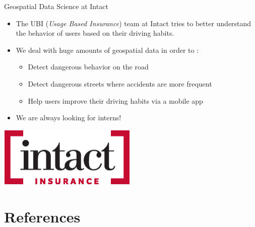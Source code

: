 \documentclass[aspectratio=169]{beamer}
\begin{document}
\begin{frame}{Geospatial Data Science at Intact}
\begin{itemize}
	\item The UBI (\textit{Usage Based Insurance}) team at Intact tries to better understand the behavior of users based on their driving habits.
	\vspace{.5cm}
	\item We deal with huge amounts of geospatial data in order to :
	\begin{itemize}
		\item Detect dangerous behavior on the road
		\item Detect dangerous streets where accidents are more frequent
		\item Help users improve their driving habits via a mobile app
	\end{itemize}
	\vspace{.5cm}
	\item We are always looking for interns!
\end{itemize}

\centering
\href{https://careers.intact.ca/ca/en/}{\includegraphics[width=.2\textwidth]{figures/intact_logo}}
\end{frame}


\section*{References}

\end{document}
